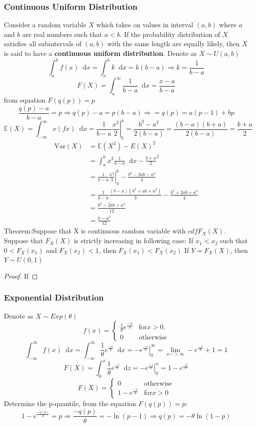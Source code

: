 \documentclass{article}
\newcommand{\E}{\mathbb{E}}
\newcommand{\Var}{\mathrm{Var}}
\newcommand{\sqr}[1]{{#1}^2}
\newcommand{\uint}[4]{\int_{#1}^{#2} #3 \dd #4}
\newcommand{\dd}{\mathop{}\!\mathrm{d}}
\newcommand{\eval}[3]{\left. #1 \right|_{#2}^{#3}}
\begin{document}
\subsubsection{Continuous Uniform Distribution}
Consider a random variable $X$ which takes on values in interval $(a,b)$ where $a$ and $b$ are real numbers such that $a < b$. If the probability distribution of $X$ satisfies all subintervals of $(a,b)$ with the same length are equally likely,
then $X$ is said to have a \textbf{continuous uniform distribution}. Denote as $X \sim U(a, b)$
$$ \uint{a}{b}{f(x)}{x} = \uint{a}{b}{k}{x} = k(b-a) \Rightarrow k = \frac{1}{b-a}$$
$$ F(X) = \uint{a}{\infty}{\frac{1}{b-a}}{x} = \frac{x-a}{b-a}$$
from equation $F(q(p)) = p$
$$\frac{q(p) - a}{b-a} = p \Rightarrow q(p) - a = p(b-a) \Rightarrow = q(p) = a(p-1) + bp$$
$$\E(X) = \uint{-\infty}{\infty}{x(fx)}{x} = \eval{\frac{1}{b-a}\frac{x^2}{2}}{b}{a}
= \frac{\sqr{b} - \sqr{a}}{2(b -a)} = \frac{(b-a)(b+a)}{2(b-a)} = \frac{b+a}{2}$$
\begin{align*}
    \Var(X) &= \E(\sqr{X}) - \sqr{E(X)} \\
    &= \uint{a}{b}{x^2 \frac{1}{b-a}}{x} - \sqr{\frac{b+a}{2}} \\
    &= \frac{1}{b-a} \eval{\frac{x^3}{3}}{a}{b} - \frac{\sqr{b} - 2ab - \sqr{a}}{4} \\
    &= \frac{1}{b-a} \frac{(b-a)(\sqr{b} +ab + \sqr{a})}{3} - \frac{\sqr{b} + 2ab + \sqr{a}}{4}\\
    &= \frac{\sqr{b} - 2ab + \sqr{a}}{12} \\
    &= \frac{\sqr{b-a}}{12}
\end{align*}
Theorem:Suppose that X is continuous random variable with $cdf F_X(X)$. Suppose that $F_X(X)$ is strictly increasing in following case: If $x_1<x_2$ such that $0<F_X(x_1)$ and $F_X(x_2) < 1$, then $F_X(x_1) < F_X(x_2)$ If $Y = F_X(X)$, then $Y \sim U(0,1)$
\begin{proof}
If 
\end{proof}
\subsubsection{Exponential Distribution}
Denote as $X \sim Exp(\theta)$
\[f(x) = \begin{cases}
    \frac{1}{\theta}e^{\frac{-X}{\theta}} & \text{for} x > 0, \\
    0 & \text{otherwise} 
\end{cases}\]
$$\uint{-\infty}{\infty}{f(x)}{x} = \uint{-\infty}{\infty}{\frac{1}{\theta}e^{\frac{-x}{\theta}}}{x} = \eval{-e^{\frac{-x}{\theta}}}{0}{\infty} = \lim_{x -> \infty}-e^{\frac{-x}{\theta}} + 1 = 1$$
$$F(X) = \uint{0}{x}{\frac{1}{\theta}e^{\frac{-z}{\theta}}}{z} = \eval{-e^{\frac{-z}{\theta}}}{0}{x} = 1 - e^{\frac{-x}{\theta}}$$
\[F(X) = \begin{cases}
    0 & \text{otherwise} \\
    1 - e^{\frac{-x}{\theta}} & \text{for} x > 0
\end{cases}\]
Determine the p-quantile, from the equation $F(q(p)) = p:$
$$1 - e^{\frac{-q(p)}{\theta}} = p \Rightarrow \frac{-q(p)}{\theta} = -\ln(p-1) \Rightarrow q(p) = -\theta\ln(1-p)$$
\end{document}
